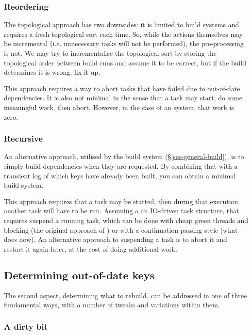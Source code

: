 \subsubsection{Reordering}\label{sec-reordering}

The topological approach has two downsides: it is limited to 
build systems and requires a fresh topological sort each time.  So, while the
actions themselves may be incremental (i.e. unnecessary tasks will not be performed),
the pre-processing is not. We may try to incrementalise the topological sort by
storing the topological order between build runs and assume it to
be correct, but if the build determines it is wrong, fix it up.

This approach requires a way to abort tasks that have failed due to out-of-date
dependencies. It is also not minimal in the sense that a task may start, do some
meaningful work, then abort. However, in the case of an  system,
that work is zero.

\subsubsection{Recursive}\label{sec-recursive}

An alternative approach, utilised by the  build system
(\S\ref{sec-general-build}), is to simply build dependencies when they are
requested. By combining that with a transient log of which keys have already
been built, you can obtain a minimal build system.

This approach requires that a task may be started, then during that execution
another task will have to be run. Assuming a an IO-driven task structure,
that requires suspend a running task, which can be done with cheap
green threads and blocking (the original approach of \Shake) or with a
continuation-passing style (what \Shake does now). An alternative approach to
suspending a task is to abort it and restart it again later, at the cost
of doing additional work.

\subsection{Determining out-of-date keys} \label{sec-out-of-date}

The second aspect, determining what to rebuild, can be addressed in one of three
fundamental ways, with a number of tweaks and variations within them.

\subsubsection{A dirty bit}\label{sec-dirty-bit}

